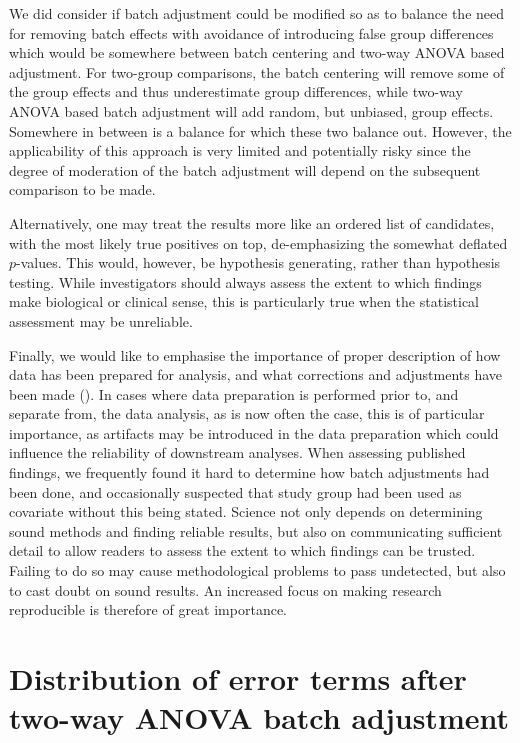 \documentclass{bio}
\begin{document}
We did consider if batch adjustment could be modified so as to balance the need for removing batch effects with avoidance of introducing false group differences which would be somewhere between batch centering and two-way ANOVA based adjustment. For two-group comparisons, the batch centering will remove some of the group effects and thus underestimate group differences, while two-way ANOVA based batch adjustment will add random, but unbiased, group effects. Somewhere in between is a balance for which these two balance out. However, the applicability of this approach is very limited and potentially risky since the degree of moderation of the batch adjustment will depend on the subsequent comparison to be made.

Alternatively, one may treat the results more like an ordered list of candidates, with the most likely true positives on top, de-emphasizing the somewhat deflated $p$-values. This would, however, be hypothesis generating, rather than hypothesis testing. While investigators should always assess the extent to which findings make biological or clinical sense, this is particularly true when the statistical assessment may be unreliable.

Finally, we would like to emphasise the importance of proper description of how data has been prepared for analysis, and what corrections and adjustments have been made (\citealp{Sandve2013}). In cases where data preparation is performed prior to, and separate from, the data analysis, as is now often the case, this is of particular importance, as artifacts may be introduced in the data preparation which could influence the reliability of downstream analyses. When assessing published findings, we frequently found it hard to determine how batch adjustments had been done, and occasionally suspected that study group had been used as covariate without this being stated. Science not only depends on determining sound methods and finding reliable results, but also on communicating sufficient detail to allow readers to assess the extent to which findings can be trusted. Failing to do so may cause methodological problems to pass undetected, but also to cast doubt on sound results. An increased focus on making research reproducible is therefore of great importance.



\appendix
\section{Distribution of error terms after two-way ANOVA batch adjustment}
\label{sec:chiApprox}
\end{document}
